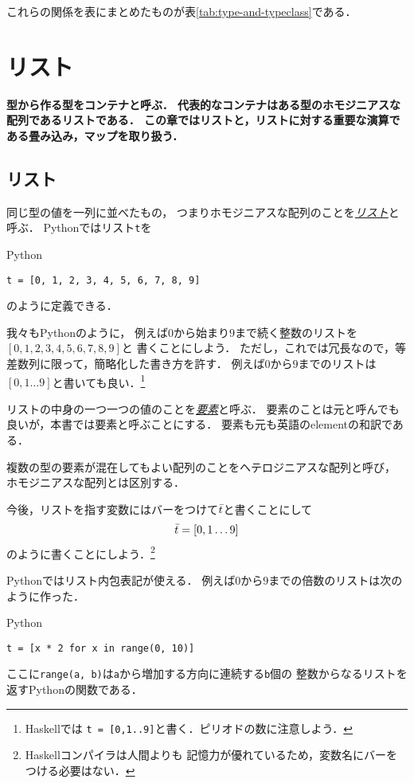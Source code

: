 \documentclass[a5paper,draft]{jsbook}
\newcommand{\programminglanguage}[1]{\textsf{#1}}
\newcommand{\haskell}{\programminglanguage{Haskell}}
\newcommand{\python}{\programminglanguage{Python}}
\newenvironment{leader}{\begingroup\bf}{\endgroup}
\newcommand{\keyword}[1]{{\underline{\emph{#1}}}}
\newcommand{\code}[1]{\texttt{#1}}
\newenvironment{pythoncode}{\begin{itembox}[r]{\python}}{\end{itembox}}
\newcommand{\mathListVar}[1]{\Bar{#1}}
\begin{document}
これらの関係を表にまとめたものが表\ref{tab:type-and-typeclass}である．

\chapter{リスト}
\begin{leader}
型から作る型をコンテナと呼ぶ．
代表的なコンテナはある型のホモジニアスな配列であるリストである．
この章ではリストと，リストに対する重要な演算である畳み込み，マップを取り扱う．
\end{leader}


\section{リスト}

同じ型の値を一列に並べたもの，
つまりホモジニアスな配列のことを\keyword{リスト}と呼ぶ．
\python ではリスト\code{t}を
\begin{pythoncode}
\begin{verbatim}
t = [0, 1, 2, 3, 4, 5, 6, 7, 8, 9]
\end{verbatim}
\end{pythoncode}
のように定義できる．

我々も\python のように，
例えば$0$から始まり$9$まで続く整数のリストを$[0,1,2,3,4,5,6,7,8,9]$と
書くことにしよう．
ただし，これでは冗長なので，等差数列に限って，簡略化した書き方を許す．
例えば$0$から$9$までのリストは$[0,1\dots9]$と書いても良い．\footnote{\haskell では
\code{t = [0,1..9]}と書く．ピリオドの数に注意しよう．}

リストの中身の一つ一つの値のことを\keyword{要素}と呼ぶ．
要素のことは元と呼んでも良いが，本書では要素と呼ぶことにする．
要素も元も英語のelementの和訳である．

複数の型の要素が混在してもよい配列のことをヘテロジニアスな配列と呼び，
ホモジニアスな配列とは区別する．

今後，リストを指す変数にはバーをつけて$\mathListVar{t}$と書くことにして
\begin{equation}
\mathListVar{t}=[0,1\dots9]
\end{equation}
のように書くことにしよう．\footnote{\haskell コンパイラは人間よりも
記憶力が優れているため，変数名にバーをつける必要はない．}

\python ではリスト内包表記が使える．
例えば$0$から$9$までの倍数のリストは次のように作った．
\begin{pythoncode}
\begin{verbatim}
t = [x * 2 for x in range(0, 10)]
\end{verbatim}
\end{pythoncode}
ここに\code{range(a, b)}は\code{a}から増加する方向に連続する\code{b}個の
整数からなるリストを返す\python の関数である．
\end{document}
